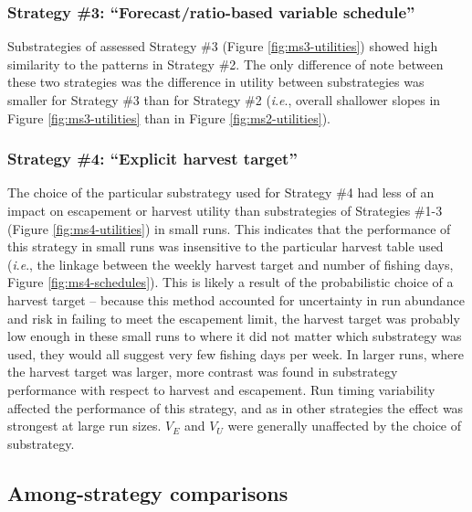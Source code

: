 \documentclass[12pt,]{book}
\theoremstyle{definition}
\theoremstyle{definition}
\theoremstyle{definition}
\theoremstyle{remark}
\begin{document}
\subsubsection{\texorpdfstring{Strategy \#3: ``Forecast/ratio-based
variable
schedule''}{Strategy \#3: Forecast/ratio-based variable schedule}}\label{strategy-3-forecastratio-based-variable-schedule-1}

\noindent
Substrategies of assessed Strategy \#3 (Figure \ref{fig:ms3-utilities})
showed high similarity to the patterns in Strategy \#2. The only
difference of note between these two strategies was the difference in
utility between substrategies was smaller for Strategy \#3 than for
Strategy \#2 (\emph{i}.\emph{e}., overall shallower slopes in Figure
\ref{fig:ms3-utilities} than in Figure \ref{fig:ms2-utilities}).

\subsubsection{\texorpdfstring{Strategy \#4: ``Explicit harvest
target''}{Strategy \#4: Explicit harvest target}}\label{strategy-4-explicit-harvest-target-1}

\noindent
The choice of the particular substrategy used for Strategy \#4 had less
of an impact on escapement or harvest utility than substrategies of
Strategies \#1-3 (Figure \ref{fig:ms4-utilities}) in small runs. This
indicates that the performance of this strategy in small runs was
insensitive to the particular harvest table used (\emph{i}.\emph{e}.,
the linkage between the weekly harvest target and number of fishing
days, Figure \ref{fig:ms4-schedules}). This is likely a result of the
probabilistic choice of a harvest target -- because this method
accounted for uncertainty in run abundance and risk in failing to meet
the escapement limit, the harvest target was probably low enough in
these small runs to where it did not matter which substrategy was used,
they would all suggest very few fishing days per week. In larger runs,
where the harvest target was larger, more contrast was found in
substrategy performance with respect to harvest and escapement. Run
timing variability affected the performance of this strategy, and as in
other strategies the effect was strongest at large run sizes. \(V_E\)
and \(V_U\) were generally unaffected by the choice of substrategy.

\subsection{Among-strategy
comparisons}\label{among-strategy-comparisons-1}
\end{document}
